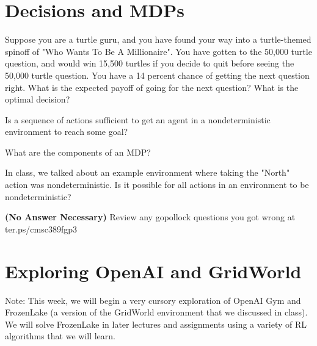 \documentclass{exam}
\begin{document}
\section{Decisions and MDPs}

\begin{questions}

\question Suppose you are a turtle guru, and you have found your way into a turtle-themed spinoff of "Who Wants To Be A Millionaire". You have gotten to the 50,000 turtle question, and would win 15,500 turtles if you decide to quit before seeing the 50,000 turtle question. You have a 14 percent chance of getting the next question right. What is the expected payoff of going for the next question? What is the optimal decision?
\begin{solution}
\end{solution}

\question Is a sequence of actions sufficient to get an agent in a nondeterministic environment to reach some goal?
\begin{solution}
\end{solution}

\question What are the components of an MDP?
\begin{solution}
\end{solution}

\question In class, we talked about an example environment where taking the "North" action was nondeterministic. Is it possible for all actions in an environment to be nondeterministic? 
\begin{solution}
\end{solution}

\question \textbf{(No Answer Necessary)} Review any gopollock questions you got wrong at ter.ps/cmsc389fgp3
\begin{solution}
\end{solution}

\end{questions}

\section{Exploring OpenAI and GridWorld}

Note: This week, we will begin a very cursory exploration of OpenAI Gym and FrozenLake (a version of the GridWorld environment that we discussed in class). We will solve FrozenLake in later lectures and assignments using a variety of RL algorithms that we will learn. \\
\end{document}
